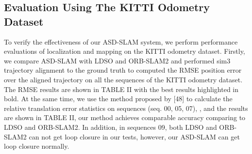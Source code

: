 \documentclass[letterpaper, 10 pt, conference]{ieeeconf}  %
\begin{document}
\subsection{Evaluation Using The KITTI Odometry Dataset}
To verify the effectiveness of our ASD-SLAM system, we perform performance evaluations of localization and mapping on the KITTI odometry dataset. Firstly, we compare ASD-SLAM with LDSO and ORB-SLAM2  and performed sim3 trajectory alignment to the ground truth to computed the RMSE position error over the aligned trajectory on all the sequences of the KITTI odometry dataset. The RMSE results are shown in TABLE II with the best results highlighted in bold. At the same time, we use the method proposed by [48] to calculate the relative translation error statistics on sequences (seq. 00, 05, 07), , and the results are shown in TABLE II, our method achieves comparable accuracy comparing to LDSO and ORB-SLAM2. In addition,  in sequences 09, both LDSO and ORB-SLAM2 can not get loop closure in our tests, however, our ASD-SLAM can get loop closure normally.
\end{document}
